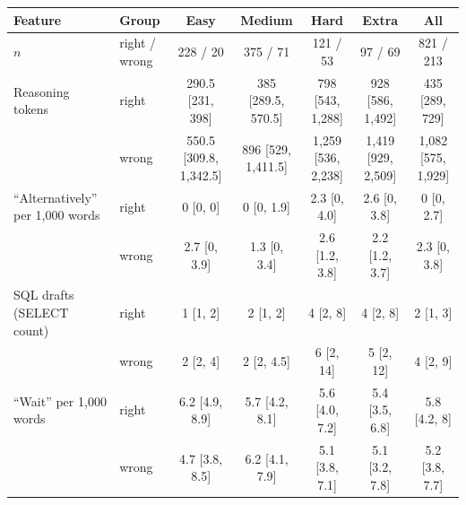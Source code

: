 \begin{tabular}{@{}ll ccccc@{}}
\toprule
Feature & Group & Easy & Medium & Hard & Extra & All \\
\midrule
$n$ & right / wrong & 228 / 20 & 375 / 71 & 121 / 53 & 97 / 69 & 821 / 213 \\
\midrule
Reasoning tokens & right & 290.5 [231, 398] & 385 [289.5, 570.5] & 798 [543, 1,288] & 928 [586, 1,492] & 435 [289, 729] \\
 & wrong & 550.5 [309.8, 1,342.5] & 896 [529, 1,411.5] & 1,259 [536, 2,238] & 1,419 [929, 2,509] & 1,082 [575, 1,929] \\
\addlinespace
``Alternatively'' per 1,000 words & right & 0 [0, 0] & 0 [0, 1.9] & 2.3 [0, 4.0] & 2.6 [0, 3.8] & 0 [0, 2.7] \\
 & wrong & 2.7 [0, 3.9] & 1.3 [0, 3.4] & 2.6 [1.2, 3.8] & 2.2 [1.2, 3.7] & 2.3 [0, 3.8] \\
\addlinespace
SQL drafts (SELECT count) & right & 1 [1, 2] & 2 [1, 2] & 4 [2, 8] & 4 [2, 8] & 2 [1, 3] \\
 & wrong & 2 [2, 4] & 2 [2, 4.5] & 6 [2, 14] & 5 [2, 12] & 4 [2, 9] \\
\addlinespace
``Wait'' per 1,000 words & right & 6.2 [4.9, 8.9] & 5.7 [4.2, 8.1] & 5.6 [4.0, 7.2] & 5.4 [3.5, 6.8] & 5.8 [4.2, 8] \\
 & wrong & 4.7 [3.8, 8.5] & 6.2 [4.1, 7.9] & 5.1 [3.8, 7.1] & 5.1 [3.2, 7.8] & 5.2 [3.8, 7.7] \\
\bottomrule
\end{tabular}
